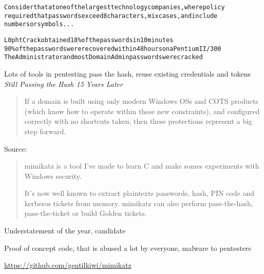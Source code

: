 \documentclass[Screen16to9,17pt]{foils}
\begin{document}


\begin{alltt}
\small
Consider that at one of the largest technology companies, where policy
required that passwords exceed 8 characters, mix cases, and include
numbers or symbols...

L0phtCrack obtained 18\% of the passwords in 10 minutes
90\% of the passwords were recovered within 48 hours on a Pentium II/300
The Administrator and most Domain Admin passwords were cracked
\end{alltt}


Lots of tools in pentesting pass the hash, reuse existing credentials and tokens
\emph{Still Passing the Hash 15 Years Later}\\

\begin{quote}
If a domain is built using only modern Windows OSs and COTS products (which know how to operate within these new constraints), and configured correctly with no shortcuts taken, then these protections represent a big step forward.
\end{quote}

Source:\\
{\small{}
}


\begin{quote}
mimikatz is a tool I've made to learn C and make somes experiments with Windows security.

It's now well known to extract plaintexts passwords, hash, PIN code and kerberos tickets from memory. mimikatz can also perform pass-the-hash, pass-the-ticket or build Golden tickets.
\end{quote}

\begin{list2}
\item Understatement of the year, candidate
\item Proof of concept code, that is abused a lot by everyone, malware to pentesters
\item \url{https://github.com/gentilkiwi/mimikatz}
\end{list2}
\end{document}

